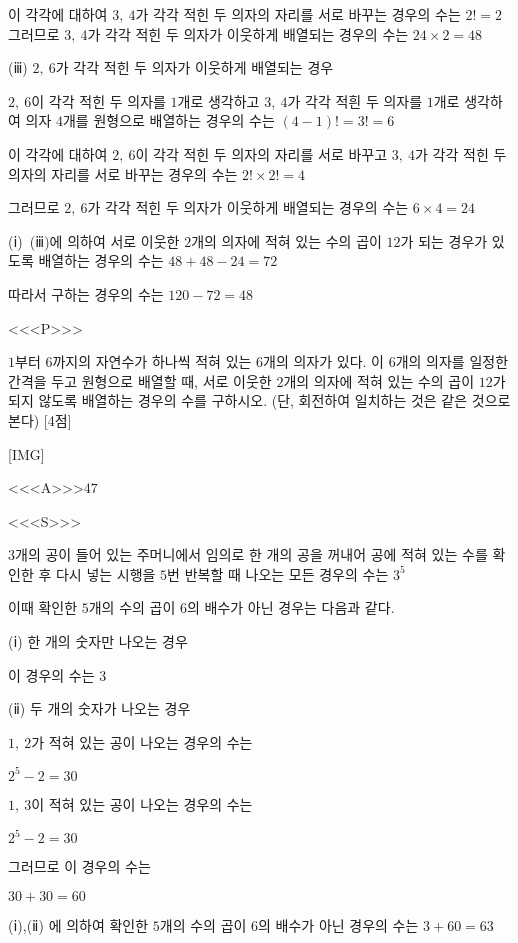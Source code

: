 \documentclass{oblivoir}
\begin{document}
이 각각에 대하여 $3,\: 4$가 각각 적힌 두 의자의 자리를 서로 바꾸는 경우의 수는 $2! =2$ 
그러므로 $3,\: 4$가 각각 적힌 두 의자가 이웃하게 배열되는 경우의 수는 $24\times 2=48$

(ⅲ) $2,\: 6$가 각각 적힌 두 의자가 이웃하게 배열되는 경우

$2,\: 6$이 각각 적힌 두 의자를 $1$개로 생각하고 $3,\: 4$가 각각 적흰 두 의자를 $1$개로 생각하여 의자 $4$개를 원형으로 배열하는 경우의 수는 $(4-1)! =3! =6$

이 각각에 대하여 $2,\: 6$이 각각 적힌 두 의자의 자리를 서로 바꾸고 $3,\: 4$가 각각 적힌 두 의자의 자리를 서로 바꾸는 경우의 수는 $2!\times 2! =4$

그러므로 $2,\: 6$가 각각 적힌 두 의자가 이웃하게 배열되는 경우의 수는 $6\times 4=24$

(ⅰ)~(ⅲ)에 의하여 서로 이웃한 $2$개의 의자에 적혀 있는 수의 곱이 $12$가 되는 경우가 있도록 배열하는 경우의 수는 $48+48-24=72$

따라서 구하는 경우의 수는 $120-72=48$

<<<P>>>

$1$부터 $6$까지의 자연수가 하나씩 적혀 있는 $6$개의 의자가 있다. 이 $6$개의 의자를 일정한 간격을 두고 원형으로 배열할 때, 서로 이웃한 $2$개의 의자에 적혀 있는 수의 곱이 $12$가 되지 않도록 배열하는 경우의 수를 구하시오. (단, 회전하여 일치하는 것은 같은 것으로 본다) [4점]

[IMG]

<<<A>>>$47$

<<<S>>>

$3$개의 공이 들어 있는 주머니에서 임의로 한 개의 공을 꺼내어 공에 적혀 있는 수를 확인한 후 다시 넣는 시행을 $5$번 반복할 때 나오는 모든 경우의 수는 $3^{5}$

이때 확인한 $5$개의 수의 곱이 $6$의 배수가 아닌 경우는 다음과 같다.

(ⅰ) 한 개의 숫자만 나오는 경우

이 경우의 수는 $3$

(ⅱ) 두 개의 숫자가 나오는 경우

$1,\: 2$가 적혀 있는 공이 나오는 경우의 수는

$2^{5}-2=30$

$1,\: 3$이 적혀 있는 공이 나오는 경우의 수는

$2^{5}-2=30$

그러므로 이 경우의 수는

$30+30=60$

(ⅰ),(ⅱ) 에 의하여 확인한 $5$개의 수의 곱이 $6$의 배수가 아닌 경우의 수는 $3+60=63$
\end{document}
